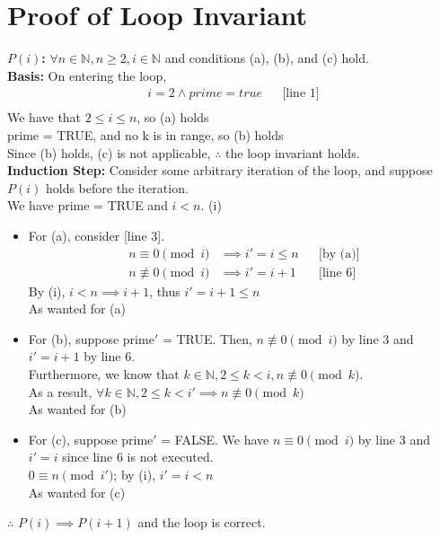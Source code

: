 \documentclass{article}
\begin{document}
	\section*{Proof of Loop Invariant}
	\textbf{$P(i)$: } $\forall n \in \mathbb{N}, n \geq 2, i \in \mathbb{N}$ and conditions (a), (b), and (c) hold.  \\
	\textbf{Basis:} On entering the loop,\\
	\begin{align*}
	i = 2 \land prime = true &&\text{[line 1]}\\
	\end{align*}
	We have that $2 \leq i \leq n$, so (a) holds\\
	prime = TRUE, and no k is in range, so (b) holds\\
	Since (b) holds, (c) is not applicable, 
	$\therefore$ the loop invariant holds.\\
	\textbf{Induction Step:} Consider some arbitrary iteration of the loop, and suppose $P(i)$ holds before the iteration.\\
	We have prime = TRUE and $i<n$. (i)
	\begin{itemize}
		\item For (a), consider [line 3].\\
			\begin{align*}
				n \equiv 0 \pmod{i} &\implies i' = i \leq n &&\text{[by (a)]} \\
				n \not\equiv 0 \pmod{i} &\implies i' = i+1 &&\text{[line 6]}
			\end{align*}
			By (i), $i<n \implies i+1$, thus $i' = i+1 \leq n$ \\As wanted for (a)
		\item For (b), suppose prime$'$ = TRUE. Then, $n \not\equiv 0 \pmod{i}$ by line 3 and $i' = i+1$ by line 6.\\
			Furthermore, we know that $k \in \mathbb{N}, 2 \leq k < i, n \not\equiv 0 \pmod{k}$.\\
			As a result, $\forall k \in \mathbb{N}, 2 \leq k < i' \implies n \not\equiv 0 \pmod{k}$\\
			As wanted for (b)
		\item For (c), suppose prime$'$ = FALSE. We have $n \equiv 0 \pmod{i}$ by line 3 and $i' = i$ since line 6 is not executed.\\
			$0 \equiv n \pmod{i'}$; by (i), $i' = i < n$\\
			As wanted for (c)
	\end{itemize}
	$\therefore$ $P(i) \implies P(i+1)$ and the loop is correct.
\end{document}
